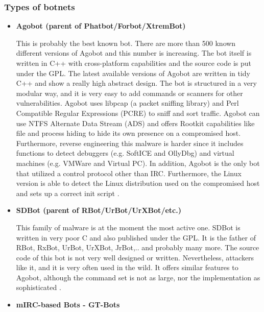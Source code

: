 \documentclass[]{article}
\begin{document}
\subsubsection{Types of botnets}

\begin{itemize}
	\item \textbf{Agobot (parent of Phatbot/Forbot/XtremBot)}

This is probably the best known bot. There are more than 500 known different versions of Agobot and this number is increasing. The bot itself is written in C++ with cross-platform capabilities and the source code is put under the GPL. The latest available versions of Agobot are written in tidy C++ and show a really high abstract design. The bot is structured in a very modular way, and it is very easy to add commands or scanners for other vulnerabilities. Agobot uses libpcap (a packet sniffing library) and Perl Compatible Regular Expressions (PCRE) to sniff and sort traffic. Agobot can use NTFS Alternate Data Stream (ADS) and offers Rootkit capabilities like file and process hiding to hide its own presence on a compromised host. Furthermore, reverse engineering this malware is harder since it includes functions to detect debuggers (e.g. SoftICE and OllyDbg) and virtual machines (e.g. VMWare and Virtual PC). In addition, Agobot is the only bot that utilized a control protocol other than IRC. Furthermore, the Linux version is able to detect the Linux distribution used on the compromised host and sets up a correct init script \cite{article:honeypot-tracking}.

\item \textbf{SDBot (parent of RBot/UrBot/UrXBot/etc.)}

This family of malware is at the moment the most active one. SDBot is written in very poor C and also published under the GPL. It is the father of RBot, RxBot, UrBot, UrXBot, JrBot,.. and probably many more. The source code of this bot is not very well designed or written. Nevertheless, attackers like it, and it is very often used in the wild. It offers similar features to Agobot, although the command set is not as large, nor the implementation as sophisticated \cite{article:honeypot-tracking}.

\item\textbf{ mIRC-based Bots - GT-Bots}


\end{itemize}
\end{document}

